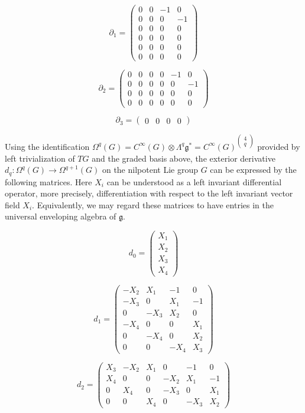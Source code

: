 \documentclass[reqno,12pt]{amsart}
\newcommand\goe{\mathfrak g}
\theoremstyle{plain}
\theoremstyle{definition}
\begin{document}
$$
\partial_1=\left(\begin{array}{cc|c|c}
0&0&-1&0\\
\hline
0&0&0&-1\\
0&0&0&0\\
\hline
0&0&0&0\\
0&0&0&0\\
\hline
0&0&0&0
\end{array}\right)
$$

$$
\partial_2=\left(\begin{array}{c|cc|cc|c}
0&0&0&0&-1&0\\\hline
0&0&0&0&0&-1\\\hline
0&0&0&0&0&0\\
0&0&0&0&0&0
\end{array}\right)
$$

$$
\partial_3=\left(\begin{array}{c|c|cc}
0&0&0&0
\end{array}\right)
$$


Using the identification $\Omega^q(G)=C^\infty(G)\otimes\Lambda^q\goe^*=C^\infty(G)^{\left(\substack{4\\q}\right)}$ provided by left trivialization of $TG$ and the graded basis above, the exterior derivative $d_q\colon\Omega^q(G)\to\Omega^{q+1}(G)$ on the nilpotent Lie group $G$ can be expressed by the following matrices.
Here $X_i$ can be understood as a left invariant differential operator, more precisely, differentiation with respect to the left invariant vector field $X_i$. Equivalently, we may regard these matrices to have entries in the universal enveloping algebra of $\goe$. 

$$
d_0=\left(\begin{array}{c}
X_1\\X_2\\\hline X_3\\\hline X_4
\end{array}\right)
$$

$$
d_1=\left(\begin{array}{cc|c|c}
-X_2&X_1&-1&0\\
\hline
-X_3&0&X_1&-1\\
0&-X_3&X_2&0\\
\hline
-X_4&0&0&X_1\\
0&-X_4&0&X_2\\
\hline
0&0&-X_4&X_3
\end{array}\right)
$$

$$
d_2=\left(\begin{array}{c|cc|cc|c}
X_3&-X_2&X_1&0&-1&0\\\hline
X_4&0&0&-X_2&X_1&-1\\\hline
0&X_4&0&-X_3&0&X_1\\
0&0&X_4&0&-X_3&X_2
\end{array}\right)
$$
\end{document}

